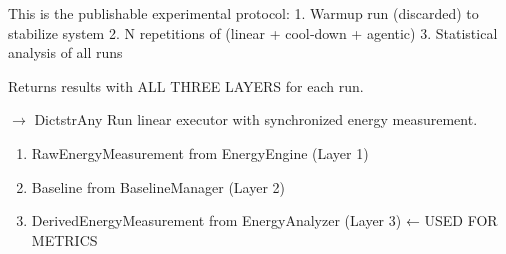 \documentclass[letterpaper,10pt,english]{sphinxmanual}
\begin{document}
\begin{fulllineitems}
\begin{fulllineitems}
\sphinxAtStartPar
This is the publishable experimental protocol:
1. Warmup run (discarded) to stabilize system
2. N repetitions of (linear + cool‑down + agentic)
3. Statistical analysis of all runs

\sphinxAtStartPar
Returns results with ALL THREE LAYERS for each run.

\end{fulllineitems}


\begin{fulllineitems}
\label{\detokenize{core.execution.harness:core.execution.harness.ExperimentHarness.run_linear}}
\pysigstartsignatures
\pysiglinewithargsret
{}
{\sphinxparamcomma {}\sphinxparamcomma {}\sphinxparamcomma {}\sphinxparamcomma {}\sphinxparamcomma {}}
{{ $\rightarrow$ Dict\DUrole{p}{{[}}strAny\DUrole{p}{{]}}}}
\pysigstopsignatures
\sphinxAtStartPar
Run linear executor with synchronized energy measurement.
\begin{description}
\begin{enumerate}
%
\item {} 
\sphinxAtStartPar
RawEnergyMeasurement from EnergyEngine (Layer 1)

\item {} 
\sphinxAtStartPar
Baseline from BaselineManager (Layer 2)

\item {} 
\sphinxAtStartPar
DerivedEnergyMeasurement from EnergyAnalyzer (Layer 3) ← USED FOR METRICS


\end{enumerate}
\end{description}
\end{fulllineitems}
\end{fulllineitems}
\end{document}
